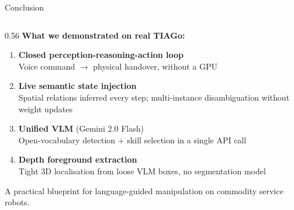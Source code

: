\documentclass[aspectratio=169, 10pt]{beamer}
\begin{document}
\begin{frame}{Conclusion}
  \begin{columns}[T]
    \begin{column}{0.56\textwidth}
      \textbf{What we demonstrated on real TIAGo:}
      \vspace{0.25em}
      \begin{enumerate}\small
        \item \textbf{Closed perception-reasoning-action loop}\\
              Voice command $\to$ physical handover,
              without a GPU
        \item \textbf{Live semantic state injection}\\
              Spatial relations inferred every step;
              multi-instance disambiguation without weight updates
        \item \textbf{Unified VLM} (Gemini 2.0 Flash)\\
              Open-vocabulary detection + skill selection
              in a single API call
        \item \textbf{Depth foreground extraction}\\
              Tight 3D localisation from loose VLM boxes,
              no segmentation model
      \end{enumerate}
      \vspace{0.2em}
      {\small\color{upecgray}
        A practical blueprint for language-guided manipulation
        on commodity service robots.}
    \end{column}


\end{columns}
\end{frame}
\end{document}
